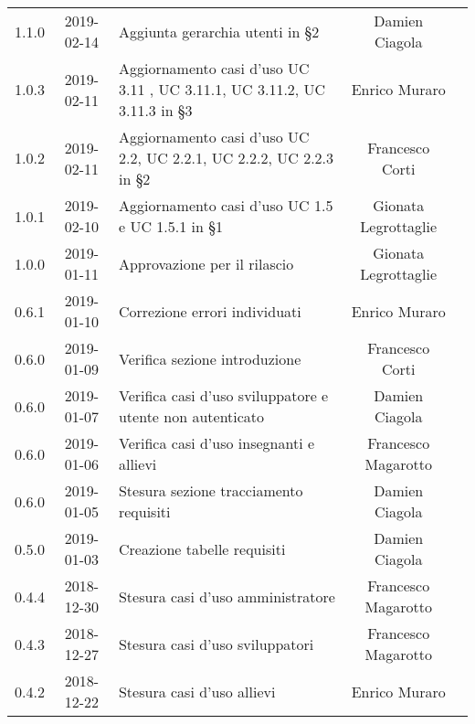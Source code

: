 {\begin{longtable}{ c c C{6cm} c c }
		1.1.0 &
		2019-02-14 &
		Aggiunta gerarchia utenti in §2 &
		Damien Ciagola&
		\reda{} \\
		
		1.0.3 &
		2019-02-11 &
		Aggiornamento casi d'uso UC 3.11 , UC 3.11.1, UC 3.11.2, UC 3.11.3 in §3 &
		Enrico Muraro&
		\reda{} \\
		
		1.0.2 &
		2019-02-11 &
		Aggiornamento casi d'uso UC 2.2, UC 2.2.1, UC 2.2.2, UC 2.2.3 in §2 &
		Francesco Corti&
		\reda{} \\

		1.0.1 &
		2019-02-10 &
		Aggiornamento casi d'uso UC 1.5 e UC 1.5.1 in §1&
		Gionata Legrottaglie&
		\reda{} \\

		1.0.0 &
		2019-01-11 &
		Approvazione per il rilascio &	
		Gionata Legrottaglie&	
		\Res{} \\
		
		0.6.1 & 
		2019-01-10 &  
		Correzione errori individuati &	
		Enrico Muraro&	
		\reda{} \\
		
		0.6.0 & 
		2019-01-09 &  
		Verifica sezione introduzione &	
		Francesco Corti&	
		\ver{} \\
		
		0.6.0 & 
		2019-01-07 &  
		Verifica casi d'uso sviluppatore e utente non autenticato& 	
		Damien Ciagola  &	
		\ver{} \\
		
		0.6.0 & 
		2019-01-06 &  
		Verifica casi d'uso insegnanti e allievi & 
		Francesco Magarotto  &
		\ver{}  \\
		
		0.6.0 & 
		2019-01-05 &  
		Stesura sezione tracciamento requisiti &	
		Damien Ciagola &	
		\reda{} \\
		
		0.5.0 & 
		2019-01-03 &  
		Creazione tabelle requisiti&	
		Damien Ciagola &	
		\reda{} \\
		
		0.4.4 & 
		2018-12-30 &  
		Stesura casi d'uso amministratore &	
		Francesco Magarotto &	
		\reda{} \\
		
		0.4.3 & 
		2018-12-27 &  
		Stesura casi d'uso sviluppatori &	
		Francesco Magarotto &	
		\reda{} \\
		
		0.4.2 & 
		2018-12-22 &  
		Stesura casi d'uso allievi &	
		Enrico Muraro	&	
		\reda{} \\	
		

\end{longtable}}
